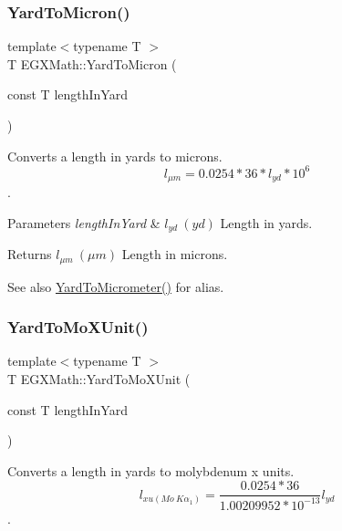 \subsubsection{\texorpdfstring{Yard\+To\+Micron()}{YardToMicron()}}
{\footnotesize\ttfamily template$<$typename T $>$ \\
T E\+G\+X\+Math\+::\+Yard\+To\+Micron (\begin{DoxyParamCaption}\item[{const T}]{length\+In\+Yard }\end{DoxyParamCaption})}



Converts a length in yards to microns. \[ l_{\mu m}=0.0254 * 36 * l_{yd} * 10^{6} \]. 


\begin{DoxyParams}{Parameters}
{\em length\+In\+Yard} & $ l_{yd}\ (yd)$ Length in yards. \\
\hline
\end{DoxyParams}
\begin{DoxyReturn}{Returns}
$ l_{\mu m}\ (\mu m)$ Length in microns. 
\end{DoxyReturn}
\begin{DoxySeeAlso}{See also}
\mbox{\hyperlink{group___e_g_x_math-_conversions-_length_conversions-_imperial-_yard-_s_i_ga9197b0613b2b3a04b62d194f04bb3692}{Yard\+To\+Micrometer()}} for alias. 
\end{DoxySeeAlso}
\mbox{\label{group___e_g_x_math-_conversions-_length_conversions-_imperial-_yard-_non-_s_i_ga81f1fa776a2154865e8ee4be46ef693d}} 
\subsubsection{\texorpdfstring{Yard\+To\+Mo\+X\+Unit()}{YardToMoXUnit()}}
{\footnotesize\ttfamily template$<$typename T $>$ \\
T E\+G\+X\+Math\+::\+Yard\+To\+Mo\+X\+Unit (\begin{DoxyParamCaption}\item[{const T}]{length\+In\+Yard }\end{DoxyParamCaption})}



Converts a length in yards to molybdenum x units. \[ l_{xu(Mo\ K\alpha_1)}=\frac{0.0254 * 36}{1.00209952*10^{-13}} l_{yd}\]. 


